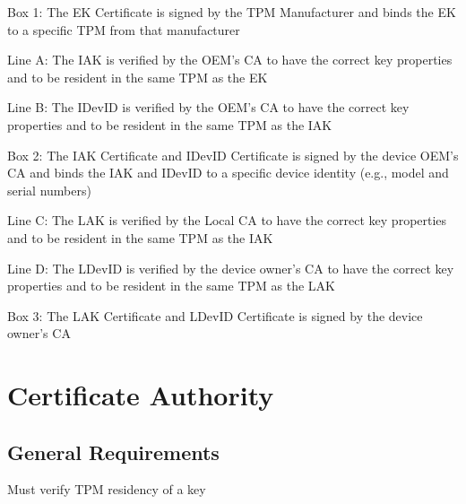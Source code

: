 \documentclass{article}
\begin{document}
Box 1: The EK Certificate is signed by the TPM Manufacturer and binds the EK to a specific TPM from that manufacturer

Line A: The IAK is verified by the OEM's CA to have the correct key properties and to be resident in the same TPM as the EK

Line B: The IDevID is verified by the OEM's CA to have the correct key properties and to be resident in the same TPM as the IAK

Box 2: The IAK Certificate and IDevID Certificate is signed by the device OEM's CA and binds the IAK and IDevID to a specific device identity (e.g., model and serial numbers)

Line C: The LAK is verified by the Local CA to have the correct key properties and to be resident in the same TPM as the IAK

Line D: The LDevID is verified by the device owner's CA to have the correct key properties and to be resident in the same TPM as the LAK

Box 3: The LAK Certificate and LDevID Certificate is signed by the device owner's CA

\section*{Certificate Authority}
\subsection*{General Requirements}
Must verify TPM residency of a key
\end{document}
